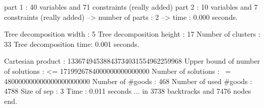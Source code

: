 \begin{enumerate}
{\begin{DoxyCode}
part 1 : 40 variables and 71 constraints (really added)
part 2 : 10 variables and 7 constraints (really added)
--> number of parts : 2
--> time : 0.000 seconds. 

Tree decomposition width  : 5
Tree decomposition height : 17
Number of clusters        : 33
Tree decomposition time: 0.001 seconds.

Cartesian product 		   :    13367494538843734031554962259968
Upper bound of number of solutions : <= 1719926784000000000000000
Number of solutions    : ~= 480000000000000000000000
Number of #goods       :    468
Number of used #goods  :    4788
Size of sep            :    3
Time                   :    0.011 seconds
... in 3738 backtracks and 7476 nodes
end.
\end{DoxyCode}}
\end{enumerate}
